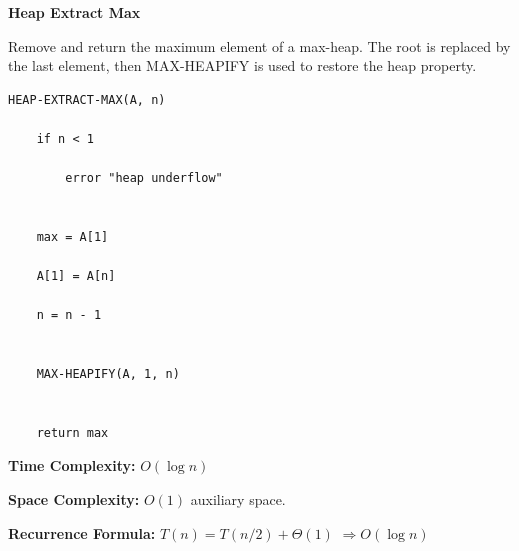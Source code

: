 \documentclass[a4paper,12pt]{article}
\begin{document}
\begin{tcolorbox}[
    colback=gray!30,
    colframe=black,
    boxrule=1pt,
    arc=0mm
]

\begin{tcolorbox}[
    colback=gray!10,
    colframe=black,
    arc=0mm
]
\centering
{\Huge\bfseries Heap Extract Max}
\end{tcolorbox}


\begin{tcolorbox}[
    colback=gray!10,
    colframe=black,
    arc=0mm
]
\small
Remove and return the maximum element of a max-heap.
The root is replaced by the last element, then MAX-HEAPIFY
is used to restore the heap property.
\end{tcolorbox}


\begin{tcolorbox}[
    colback=black!5,
    colframe=black,
    arc=0mm,
    title=Pseudo-code
]
\tiny
\begin{lstlisting}
HEAP-EXTRACT-MAX(A, n)

    if n < 1

        error "heap underflow"


    max = A[1]

    A[1] = A[n]

    n = n - 1


    MAX-HEAPIFY(A, 1, n)


    return max
\end{lstlisting}
\end{tcolorbox}


\begin{tcolorbox}[
    colback=cyan!20,
    colframe=black,
    arc=0mm
]
\small
\textbf{Time Complexity:}
$O(\log n)$
\end{tcolorbox}


\begin{tcolorbox}[
    colback=violet!20,
    colframe=black,
    arc=0mm
]
\small
\textbf{Space Complexity:}
$O(1)$ auxiliary space.
\end{tcolorbox}


\begin{tcolorbox}[
    colback=pink!20,
    colframe=black,
    arc=0mm
]
\small
\textbf{Recurrence Formula:}
$T(n)=T(n/2)+\Theta(1)$
$\Rightarrow O(\log n)$
\end{tcolorbox}

\end{tcolorbox}
\end{document}
